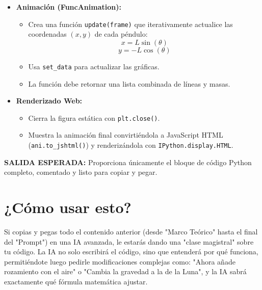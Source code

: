 \documentclass[a4paper,11pt]{article}
\begin{document}
\begin{tcolorbox}[colback=gray!10, colframe=black, title=\textbf{INSTRUCCIÓN DEL SISTEMA}]
\begin{itemize}
			\item \textbf{Animación (FuncAnimation):}
			\begin{itemize}
				\item Crea una función \texttt{update(frame)} que iterativamente actualice las coordenadas $(x, y)$ de cada péndulo:
				\[ x = L \sin(\theta) \]
				\[ y = -L \cos(\theta) \]
				\item Usa \texttt{set\_data} para actualizar las gráficas.
				\item La función debe retornar una lista combinada de líneas y masas.
			\end{itemize}
			
			\item \textbf{Renderizado Web:}
			\begin{itemize}
				\item Cierra la figura estática con \texttt{plt.close()}.
				\item Muestra la animación final convirtiéndola a JavaScript HTML (\texttt{ani.to\_jshtml()}) y renderizándola con \texttt{IPython.display.HTML}.
			\end{itemize}
		\end{itemize}
		
		\textbf{SALIDA ESPERADA:}
		Proporciona únicamente el bloque de código Python completo, comentado y listo para copiar y pegar.
	\end{tcolorbox}
	
	\section*{¿Cómo usar esto?}
	Si copias y pegas todo el contenido anterior (desde "Marco Teórico" hasta el final del "Prompt") en una IA avanzada, le estarás dando una "clase magistral" sobre tu código. La IA no solo escribirá el código, sino que entenderá por qué funciona, permitiéndote luego pedirle modificaciones complejas como: "Ahora añade rozamiento con el aire" o "Cambia la gravedad a la de la Luna", y la IA sabrá exactamente qué fórmula matemática ajustar.
	
\end{document}
